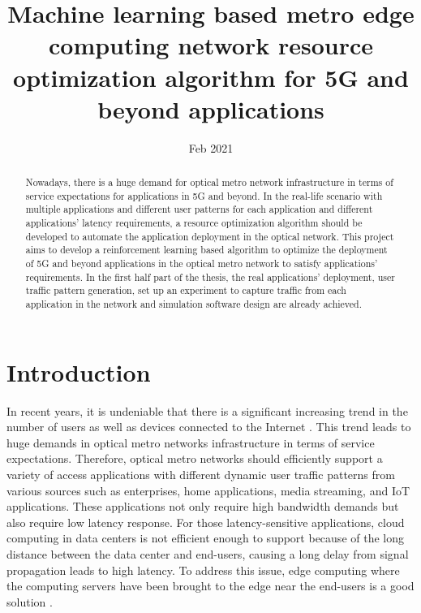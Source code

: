 \documentclass[conference]{IEEEtran}
\title{Machine learning based metro edge computing network resource optimization algorithm for 5G and beyond applications}
\author{\IEEEauthorblockN{Luong Quoc Dat}
\IEEEauthorblockA{\textit{Dept. of Electrical Engineering} \\
\textit{Technical University of Eindhoven}\\
}}
\date{Feb 2021}
\begin{document}
\maketitle

\begin{abstract}
Nowadays, there is a huge demand for optical metro network infrastructure in terms of service expectations for applications in 5G and beyond. In the real-life scenario with multiple applications and different user patterns for each application and different applications' latency requirements, a resource optimization algorithm should be developed to automate the application deployment in the optical network. This project aims to develop a reinforcement learning based algorithm to optimize the deployment of 5G and beyond applications in the optical metro network to satisfy applications’ requirements. In the first half part of the thesis, the real applications' deployment, user traffic pattern generation, set up an experiment to capture traffic from each application in the network and simulation software design are already achieved.
\end{abstract}

\section{Introduction}
\label{sec:Introduction}
In recent years, it is undeniable that there is a significant increasing trend in the number of users as well as devices connected to the Internet \cite{International2017}. This trend leads to huge demands in optical metro networks infrastructure in terms of service expectations. Therefore, optical metro networks should efficiently support a variety of access applications with different dynamic user traffic patterns from various sources such as enterprises, home applications, media streaming, and IoT applications. These applications not only require high bandwidth demands but also require low latency response. For those latency-sensitive applications, cloud computing in data centers is not efficient enough to support because of the long distance between the data center and end-users, causing a long delay from signal propagation leads to high latency. To address this issue, edge computing where the computing servers have been brought to the edge near the end-users is a good solution \cite{Shi2016}.
\end{document}
